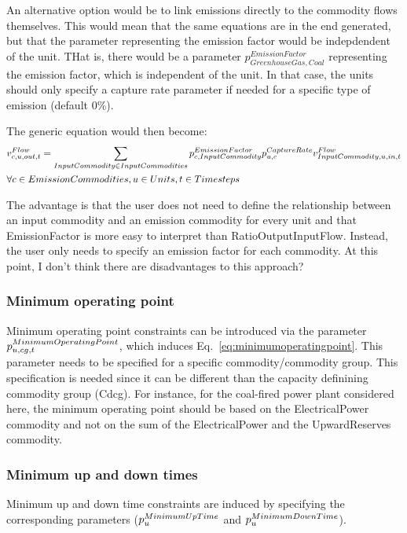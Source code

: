 \documentclass[10pt,english]{article}
\begin{document}
{\color{red} An alternative option would be to link emissions directly to the commodity flows themselves. This would mean that the same equations are in the end generated, but that the parameter representing the emission factor would be indepdendent of the unit. THat is, there would be a parameter $p^{EmissionFactor}_{GreenhouseGas,Coal}$ representing the emission factor, which is independent of the unit. In that case, the units should only specify a capture rate parameter if needed for a specific type of emission (default 0\%).

The generic equation would then become:
\begin{align}
&\vFlow[\commodity,\unit,out,\timestep] = \sum_{InputCommodity \in InputCommodities} p^{EmissionFactor}_{\commodity,InputCommodity} p^{CaptureRate}_{\unit,\commodity} \vFlow[InputCommodity,\unit,in,\timestep] \nonumber \\
&  \forall \commodity \in EmissionCommodities, \units, \timesteps
\end{align}

The advantage is that the user does not need to define the relationship between an input commodity and an emission commodity for every unit and that EmissionFactor is more easy to interpret than RatioOutputInputFlow. Instead, the user only needs to specify an emission factor for each commodity. At this point, I don't think there are disadvantages to this approach?}


\subsubsection{Minimum operating point}
Minimum operating point constraints can be introduced via the parameter $\pMinimumOperatingPoint$, which induces Eq.~\eqref{eq:minimumoperatingpoint}. This parameter needs to be specified for a specific commodity/commodity group. This specification is needed since it can be different than the capacity definining commodity group (Cdcg). For instance, for the coal-fired power plant considered here, the minimum operating point should be based on the ElectricalPower commodity and not on the sum of the ElectricalPower and the UpwardReserves commodity.


\subsubsection{Minimum up and down times}
Minimum up and down time constraints are induced by specifying the corresponding parameters ($\pMinimumUpTime$ and $\pMinimumDownTime$).
\end{document}
